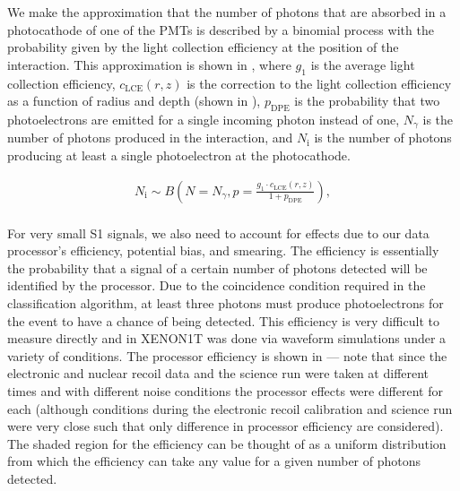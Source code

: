 We make the approximation that the number of photons that are absorbed in a photocathode of one of the PMTs is described by a binomial process with the probability given by the light collection efficiency at the position of the interaction.  This approximation is shown in , where $g_1$ is the average light collection efficiency, $c_{\textrm{LCE}}(r, z)$ is the correction to the light collection efficiency as a function of radius and depth (shown in ), $p_{\textrm{DPE}}$ is the probability that two photoelectrons are emitted for a single incoming photon instead of one, $N_{\gamma}$ is the number of photons produced in the interaction, and $N_{\textrm{i}}$ is the number of photons producing at least a single photoelectron at the photocathode.  


\begin{equation}
        \label{eqn:xe1t_binomial_lce}
        \begin{gathered}
                N_{\textrm{i}} \sim B \left( N = N_{\gamma}, p = \frac{g_1 \cdot c_{\textrm{LCE}}(r, z)}{1 + p_{\textrm{DPE}}} \right), \\
        \end{gathered}
\end{equation}


For very small S1 signals, we also need to account for effects due to our data processor's efficiency, potential bias, and smearing.  The efficiency is essentially the probability that a signal of a certain number of photons detected will be identified by the processor.  Due to the coincidence condition required in the classification algorithm, at least three photons must produce photoelectrons for the event to have a chance of being detected.  This efficiency is very difficult to measure directly and in XENON1T was done via waveform simulations under a variety of conditions.  The processor efficiency is shown in  --- note that since the electronic and nuclear recoil data and the science run were taken at different times and with different noise conditions the processor effects were different for each (although conditions during the electronic recoil calibration and science run were very close such that only difference in processor efficiency are considered).  The shaded region for the efficiency can be thought of as a uniform distribution from which the efficiency can take any value for a given number of photons detected.


